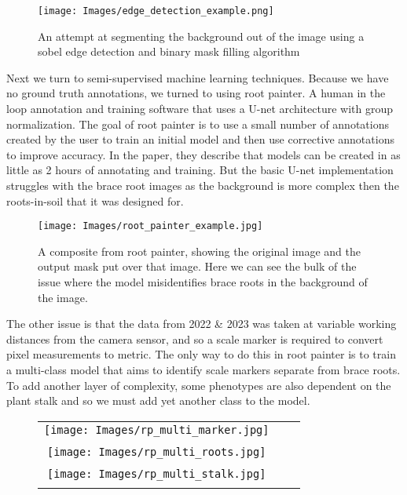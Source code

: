 \begin{figure}[H]
    \centering
    \texttt{[image: Images/edge\_detection\_example.png]}
    \caption{An attempt at segmenting the background out of the image using a sobel edge detection and binary mask filling algorithm}
    \label{fig:Edge-detection}
\end{figure}
Next we turn to semi-supervised machine learning techniques. Because we have no ground truth annotations, we turned to using root painter.\cite{Smith2022} A human in the loop annotation and training software that uses a U-net architecture with group normalization. The goal of root painter is to use a small number of annotations created by the user to train an initial model and then use corrective annotations to improve accuracy. In the paper, they describe that models can be created in as little as 2 hours of annotating and training.\cite{Smith2022} But the basic U-net implementation struggles with the brace root images as the background is more complex then the roots-in-soil that it was designed for.   
\begin{figure}[H]
    \centering
    \texttt{[image: Images/root\_painter\_example.jpg]}
    \caption{A composite from root painter, showing the original image and the output mask put over that image. Here we can see the bulk of the issue where the model misidentifies brace roots in the background of the image.}
    \label{fig:rp_example}
\end{figure}

The other issue is that the data from 2022 \& 2023 was taken at variable working distances from the camera sensor, and so a scale marker is required to convert pixel measurements to metric. The only way to do this in root painter is to train a multi-class model that aims to identify scale markers separate from brace roots. To add another layer of complexity, some phenotypes are also dependent on the plant stalk and so we must add yet another class to the model. 

\begin{figure}[H]
    \begin{tabular}{ccc}
     \texttt{[image: Images/rp\_multi\_marker.jpg]} \\\\ 
     \texttt{[image: Images/rp\_multi\_roots.jpg]} \\\\
     \texttt{[image: Images/rp\_multi\_stalk.jpg]} \\\\
    \end{tabular}
\end{figure}

